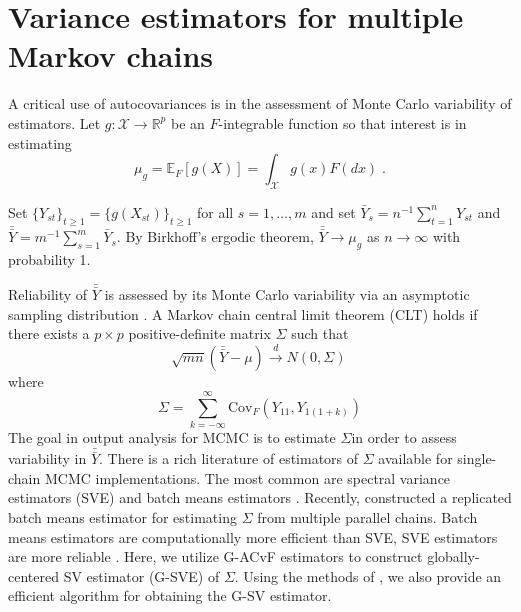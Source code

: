 \documentclass[11pt]{article}
\newcommand{\Cov}{\text{Cov}}
\newcommand{\X}{\mathcal{X}}
\theoremstyle{remark}
\begin{document}
\section{Variance estimators for multiple Markov chains} \label{sec:variance_est}

A critical use of autocovariances is in the assessment of Monte Carlo variability of estimators.  Let $g:\X \longrightarrow \mathbb{R}^p$ be an $F$-integrable function so that interest is in estimating
%
\[
\mu_g = \mathbb{E}_F[g(X)] = \int_{\X}g(x)F(dx)\;.
\]
 
Set $\{Y_{st}\}_{t \geq 1} = \{g(X_{st})\}_{t \geq 1}$ for all $s = 1, \dots, m$ and set $\bar{Y}_s = n^{-1}\sum_{t=1}^{n}Y_{st}$  and  $\bar{\bar{Y}} = m^{-1}\sum_{s=1}^{m}\bar{Y}_s$. By Birkhoff's ergodic theorem,  $\bar{\bar{Y}} \to \mu_g$ as $n \to \infty$ with probability 1.

Reliability of $\bar{\bar{Y}}$ is assessed by its Monte Carlo variability via an asymptotic sampling distribution \citep{fleg:hara:jone:2008,roy:2019,vats:rob:fle:jon:2020}. 
 A Markov chain central limit theorem (CLT) holds if there exists a $p \times p$ positive-definite matrix $\Sigma$ such that
%
\begin{equation}
\label{eq:CLT}
  \sqrt{mn}(\bar{\bar{Y}} - \mu) \xrightarrow{d} N(0,\Sigma)\,
\end{equation}
where
\begin{equation}
\label{eq:sigma}
  \Sigma = \sum_{k = -\infty}^{\infty} \Cov_F \left( Y_{11}, Y_{1(1+k)} \right)
\end{equation}
%
The goal in output analysis for MCMC is to estimate $\Sigma$in order to assess variability in $\bar{\bar{Y}}$. There is a rich literature of estimators of $\Sigma$ available for single-chain MCMC implementations. The most common are spectral variance estimators (SVE) \citep{andr:1991,vats:fleg:jon:2018} and batch means estimators \cite{chen:seila:1987,vats:fleg:jon:2019}. Recently, \cite{gupta:vats:2020} constructed a replicated batch means estimator for estimating $\Sigma$ from multiple parallel chains. Batch means estimators are computationally more efficient than SVE, SVE estimators are more reliable \citep{fleg:jone:2010}. Here, we utilize G-ACvF estimators to construct globally-centered SV estimator (G-SVE) of $\Sigma$. Using the methods of \cite{heberle2017fast}, we also provide an efficient algorithm for obtaining the G-SV estimator. 
\end{document}
